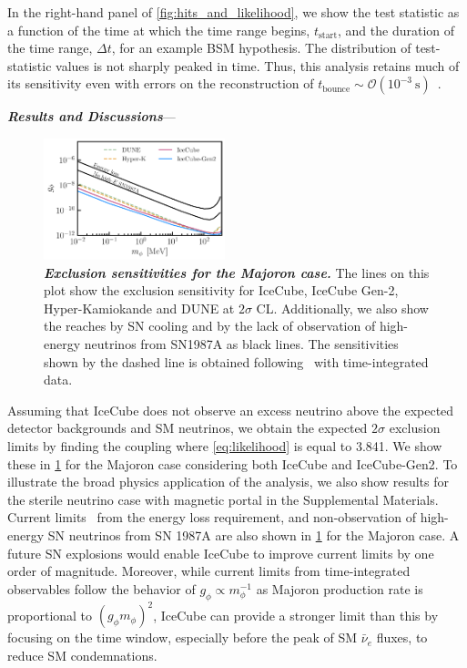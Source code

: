 \documentclass[aps,twocolumn,prl,showpacs,showkeys,preprintnumbers,superscriptaddress,nobibnotes,floatfix,longbibliography,notitlepage,nofootinbib]{revtex4-2}
\begin{document}
In the right-hand panel of \cref{fig:hits_and_likelihood}, we show the test statistic as a function of the time at which the time range begins, $t_{\mathrm{start}}$, and the duration of the time range, $\Delta t$, for an example BSM hypothesis. The distribution of test-statistic values is not sharply peaked in time.
Thus, this analysis retains much of its sensitivity even with errors on the reconstruction of $t_{\mathrm{bounce}}\sim\mathcal{O}\left(10^{-3}~\mathrm{s}\right)$~\cite{Halzen_2009}.




\textbf{\textit{Results and Discussions}}---
\begin{figure}[t!]
    \centering
    \includegraphics[width=0.47\textwidth]{figures/majoran_sensitivity}
    \caption{\textbf{\textit{Exclusion sensitivities for the Majoron case.}}
    The lines on this plot show the exclusion sensitivity for IceCube, IceCube Gen-2, Hyper-Kamiokande and DUNE at $2\sigma$ CL.
    Additionally, we also show the reaches by SN cooling and by the lack of observation of high-energy neutrinos from SN1987A as black lines. 
    The sensitivities shown by the dashed line is obtained following~\cite{Brdar:2023tmi} with time-integrated data.
    }
    \label{fig:sensitivity}
\end{figure} 
Assuming that IceCube does not observe an excess neutrino above the expected detector backgrounds and SM neutrinos, we obtain the expected $2\sigma$ exclusion limits by finding the coupling where \cref{eq:likelihood} is equal to 3.841.
We show these in \cref{fig:sensitivity} for the Majoron case considering both IceCube and IceCube-Gen2.
To illustrate the broad physics application of the analysis, we also show results for the sterile neutrino case with magnetic portal in the Supplemental Materials.
Current limits~\cite{Fiorillo:2022cdq} from the energy loss requirement, and non-observation of high-energy SN neutrinos from SN 1987A are also shown in \cref{fig:sensitivity} for the Majoron case.
A future SN explosions would enable IceCube to improve current limits by one order of magnitude. 
Moreover, while current limits from time-integrated observables follow the behavior of $g_\phi\propto m^{-1}_\phi$ as Majoron production rate is proportional to $(g_\phi m_\phi)^2$, IceCube can provide a stronger limit than this by focusing on the time window, especially before the peak of SM $\bar{\nu}_e$ fluxes, to reduce SM condemnations.
\end{document}
